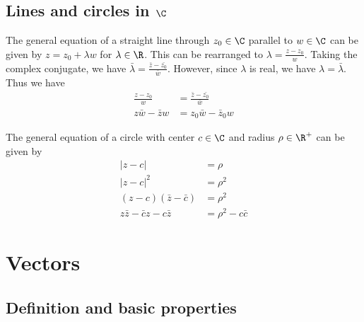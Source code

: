 \documentclass[a4paper]{article}
\begin{document}
\subsection{Lines and circles in \texorpdfstring{$\C$}{C}}
\begin{thm}
The general equation of a straight line through $z_0\in \C$ parallel to $w\in \C$ can be given by $z = z_0 + \lambda w$ for $\lambda \in \R$. This can be rearranged to $\lambda = \frac{z - z_0}{w}$. Taking the complex conjugate, we have $\bar{\lambda} = \frac{\bar{z} - \bar{z_0}}{\bar{w}}$. However, since $\lambda$ is real, we have $\lambda = \bar{\lambda}$. Thus we have
\begin{align*}
  \frac{z - z_0}{w} &= \frac{\bar{z} - \bar{z_0}}{\bar{w}}\\
  z\bar w - \bar z w &= z_0 \bar w - \bar z_0 w
\end{align*}

The general equation of a circle with center $c\in \C$ and radius $\rho \in \R^+$ can be given by
\begin{align*}
  |z - c| &= \rho\\
  |z - c|^2 &= \rho^2\\
  (z - c)(\bar z - \bar c) &= \rho^2\\
  z\bar z - \bar c z - c\bar z &= \rho^2 - c\bar c
\end{align*}
\end{thm}
\section{Vectors}
\subsection{Definition and basic properties}
\end{document}
